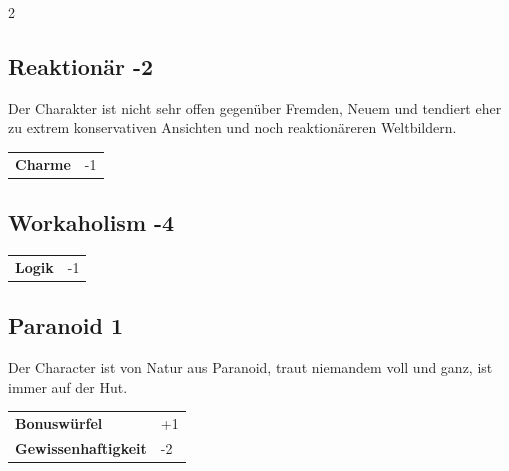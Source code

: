 \begin{multicols}{2}
\begin{tcolorbox}
    \subsection*{Reaktionär \hfill \small{-2 }}
    \tcblower
Der Charakter ist nicht sehr offen gegenüber Fremden, Neuem und tendiert eher zu extrem konservativen Ansichten und noch reaktionäreren Weltbildern.


\vspace{3mm}

\begin{tabular}{@{}ll@{}}
    \textbf{Charme} & -1\\
\end{tabular}


\end{tcolorbox}

\begin{tcolorbox}
    \subsection*{Workaholism \hfill \small{-4 }}
    \tcblower




\begin{tabular}{@{}ll@{}}
    \textbf{Logik} & -1\\
\end{tabular}


\end{tcolorbox}

\begin{tcolorbox}
    \subsection*{Paranoid \hfill \small{1 }}
    \tcblower
Der Character ist von Natur aus Paranoid, traut niemandem voll und ganz, ist immer auf der Hut.


\vspace{3mm}

\begin{tabular}{@{}ll@{}}
    \textbf{Bonuswürfel} & +1\\
    \textbf{Gewissenhaftigkeit} & -2\\
\end{tabular}


\end{tcolorbox}
\end{multicols}
